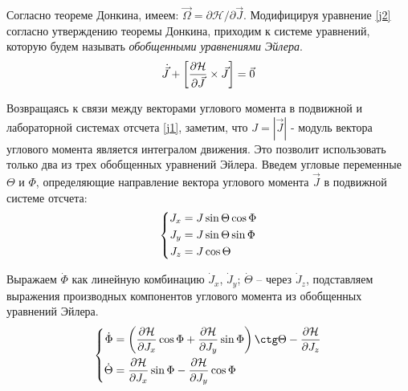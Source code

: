 Согласно теореме Донкина, имеем: $\vec{\Omega} = \partial \mathcal{H} / \partial \vec{J}$. Модифицируя уравнение \eqref{j2} согласно утверждению теоремы Донкина, приходим к системе уравнений, которую будем называть \textit{обобщенными уравнениями Эйлера}.
\vverh
\begin{gather}
\dot{\vec{J}} + \left[ \frac{\partial \mathcal{H}}{\partial \vec{J}} \times \vec{J} \right] = \vec{0} \notag
\end{gather}

Возвращаясь к связи между векторами углового момента в подвижной и лабораторной системах отсчета \eqref{j1}, заметим, что $J = | \vec{J} |$ - модуль вектора углового момента является интегралом движения. Это позволит использовать только два из трех обобщенных уравнений Эйлера. Введем угловые переменные $\Theta$ и $\Phi$, определяющие направление вектора углового момента $\vec{J}$ в подвижной системе отсчета:
\vverh
\begin{gather}
\left\{
\begin{aligned}
J_x &= J \sin \Theta \cos \Phi \\
J_y &= J \sin \Theta \sin \Phi \\
J_z &= J \cos \Theta
\end{aligned}
\right. \notag
\end{gather}

Выражаем $\dot{\Phi}$ как линейную комбинацию $\dot{J}_x$, $\dot{J}_y$; $\dot{\Theta}$ -- через $\dot{J}_z$, подставляем выражения производных компонентов углового момента из обобщенных уравнений Эйлера. 
\vverh
\begin{gather}
\left\{
\begin{aligned}
\dot{\Phi} &= \lb \frac{\partial \mathcal{H}}{\partial J_x} \cos \Phi + \frac{\partial \mathcal{H}}{\partial J_y} \sin \Phi \rb \ctg \Theta - \frac{\partial \mathcal{H}}{\partial J_z} \\
\dot{\Theta} &= \frac{\partial \mathcal{H}}{\partial J_x} \sin \Phi - \frac{\partial \mathcal{H}}{\partial J_y} \cos \Phi 
\end{aligned}
\right. \notag
\end{gather}